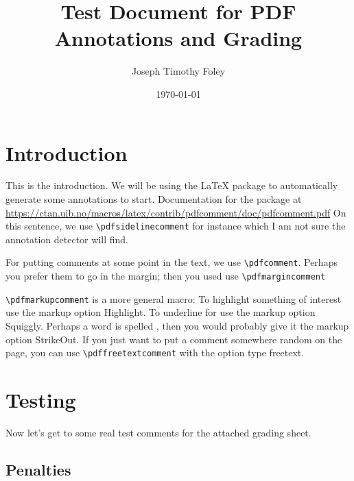 \documentclass[11pt,a4paper]{article}
\title{Test Document for PDF Annotations and Grading}
\author{Joseph Timothy Foley}
\date{\today}
\begin{document}
\maketitle{}
\newcommand{\texmacro}[1]{\texttt{\textbackslash#1}}
\section{Introduction}
This is the introduction.
We will be using the  \LaTeX{} package to automatically generate some annotations to start.
Documentation for the package at \url{https://ctan.uib.no/macros/latex/contrib/pdfcomment/doc/pdfcomment.pdf}
On this sentence, we use \texmacro{pdfsidelinecomment} for instance which I am not sure the annotation detector will find.

For putting comments at some point in the text, we use \texmacro{pdfcomment}.
Perhaps you prefer them to go in the margin; then you used use \texmacro{pdfmargincomment}

\texmacro{pdfmarkupcomment} is a more general macro:
To highlight something of interest  use the markup option Highlight.
To underline for  use the markup option Squiggly.
Perhaps a word is spelled , then you would probably give it the markup option StrikeOut.
If you just want to put a comment somewhere random on the page, you can use \texmacro{pdffreetextcomment} with the option type freetext. 

\section{Testing}
Now let's get to some real test comments for the attached grading sheet.
\subsection{Penalties}
\end{document}
